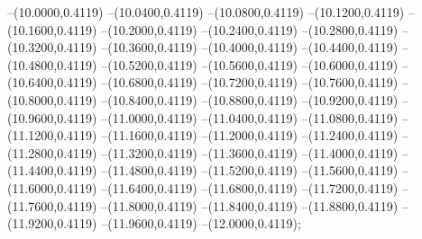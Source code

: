 {	--(10.0000,0.4119)
	--(10.0400,0.4119)
	--(10.0800,0.4119)
	--(10.1200,0.4119)
	--(10.1600,0.4119)
	--(10.2000,0.4119)
	--(10.2400,0.4119)
	--(10.2800,0.4119)
	--(10.3200,0.4119)
	--(10.3600,0.4119)
	--(10.4000,0.4119)
	--(10.4400,0.4119)
	--(10.4800,0.4119)
	--(10.5200,0.4119)
	--(10.5600,0.4119)
	--(10.6000,0.4119)
	--(10.6400,0.4119)
	--(10.6800,0.4119)
	--(10.7200,0.4119)
	--(10.7600,0.4119)
	--(10.8000,0.4119)
	--(10.8400,0.4119)
	--(10.8800,0.4119)
	--(10.9200,0.4119)
	--(10.9600,0.4119)
	--(11.0000,0.4119)
	--(11.0400,0.4119)
	--(11.0800,0.4119)
	--(11.1200,0.4119)
	--(11.1600,0.4119)
	--(11.2000,0.4119)
	--(11.2400,0.4119)
	--(11.2800,0.4119)
	--(11.3200,0.4119)
	--(11.3600,0.4119)
	--(11.4000,0.4119)
	--(11.4400,0.4119)
	--(11.4800,0.4119)
	--(11.5200,0.4119)
	--(11.5600,0.4119)
	--(11.6000,0.4119)
	--(11.6400,0.4119)
	--(11.6800,0.4119)
	--(11.7200,0.4119)
	--(11.7600,0.4119)
	--(11.8000,0.4119)
	--(11.8400,0.4119)
	--(11.8800,0.4119)
	--(11.9200,0.4119)
	--(11.9600,0.4119)
	--(12.0000,0.4119);
}
